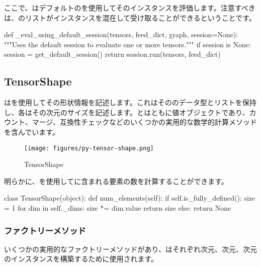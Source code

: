 \begin{content}
ここで、はデフォルトのを使用してそのインスタンスを評価します。注意すべきは、のリストがインスタンスを混在して受け取ることができるということです。

\begin{leftbar}
\begin{python}
def _eval_using_default_session(tensors, feed_dict, graph, session=None):
  """Uses the default session to evaluate one or more tensors."""
  if session is None:
    session = get_default_session()
  return session.run(tensors, feed_dict)
\end{python}
\end{leftbar}

\subsection{TensorShape}

はを使用してその形状情報を記述します。これはそののデータ型とリストを保持し、各はその次元のサイズを記述します。とはともに値オブジェクトであり、カウント、マージ、互換性チェックなどのいくつかの実用的な数学的計算メソッドを含んでいます。

\begin{figure}[H]
\centering
\texttt{[image: figures/py-tensor-shape.png]}
\caption{TensorShape}
 \label{fig:py-tensor-shape}
\end{figure}

明らかに、を使用してに含まれる要素の数を計算することができます。

\begin{leftbar}
\begin{python}
class TensorShape(object):
  def num_elements(self):
    if self.is_fully_defined():
      size = 1
      for dim in self._dims:
        size *= dim.value
      return size
    else:
      return None
\end{python}
\end{leftbar} 

\subsubsection{ファクトリーメソッド}

いくつかの実用的なファクトリーメソッドがあり、はそれぞれ次元、次元、次元のインスタンスを構築するために使用されます。


\end{content}
